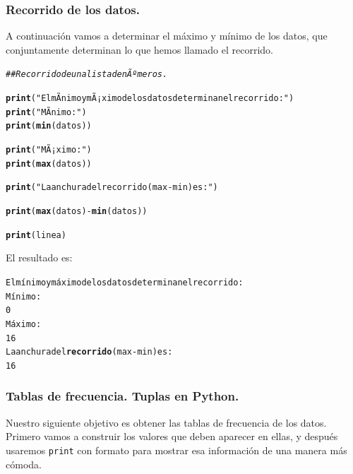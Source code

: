\documentclass[10pt,a4paper]{article}\usepackage[]{graphicx}\usepackage[]{color}
\makeatletter
\newcommand{\hlstr}[1]{\textcolor[rgb]{0.192,0.494,0.8}{#1}}%
\newcommand{\hlcom}[1]{\textcolor[rgb]{0.678,0.584,0.686}{\textit{#1}}}%
\newcommand{\hlopt}[1]{\textcolor[rgb]{0,0,0}{#1}}%
\newcommand{\hlstd}[1]{\textcolor[rgb]{0.345,0.345,0.345}{#1}}%
\newcommand{\hlkwd}[1]{\textcolor[rgb]{0.737,0.353,0.396}{\textbf{#1}}}%
\newenvironment{kframe}{%
 \def\at@end@of@kframe{}%
 \ifinner\ifhmode%
  \def\at@end@of@kframe{\end{minipage}}%
  \begin{minipage}{\columnwidth}%
 \fi\fi%
 \def\FrameCommand##1{\hskip\@totalleftmargin \hskip-\fboxsep
 \colorbox{shadecolor}{##1}\hskip-\fboxsep
     \hskip-\linewidth \hskip-\@totalleftmargin \hskip\columnwidth}%
 \MakeFramed {\advance\hsize-\width
   \@totalleftmargin\z@ \linewidth\hsize
   \@setminipage}}%
 {\par\unskip\endMakeFramed%
 \at@end@of@kframe}
\newenvironment{knitrout}{}{} %
\newcounter {cont01}
\makeatother
\begin{document}
\subsubsection*{Recorrido de los datos.}
\label{tut02:subsubsec:recorridoDatos}

A continuación vamos a determinar el máximo y mínimo de los datos, que conjuntamente determinan lo que hemos llamado el recorrido.

\begin{knitrout}
\color{fgcolor}\begin{kframe}
\begin{alltt}
\hlcom{## Recorrido de una lista de nÃºmeros.  }

\hlkwd{print}\hlstd{(}\hlstr{"El mÃ­nimo y mÃ¡ximo de los datos determinan el recorrido:"}\hlstd{)}
\hlkwd{print}\hlstd{(}\hlstr{"MÃ­nimo:"}\hlstd{)}
\hlkwd{print}\hlstd{(}\hlkwd{min}\hlstd{(datos))}

\hlkwd{print}\hlstd{(}\hlstr{"MÃ¡ximo:"}\hlstd{)}
\hlkwd{print}\hlstd{(}\hlkwd{max}\hlstd{(datos))}

\hlkwd{print}\hlstd{(}\hlstr{"La anchura del recorrido (max - min) es:"}\hlstd{)}

\hlkwd{print}\hlstd{(}\hlkwd{max}\hlstd{(datos)} \hlopt{-} \hlkwd{min}\hlstd{(datos))}

\hlkwd{print}\hlstd{(linea)}
\end{alltt}
\end{kframe}
\end{knitrout}

El resultado es:
\begin{knitrout}
\color{fgcolor}\begin{kframe}
\begin{alltt}
El mínimo y máximo de los datos determinan el recorrido:
Mínimo:
0
Máximo:
16
La anchura del \hlkwd{recorrido} (max - min) es:
16
\end{alltt}
\end{kframe}
\end{knitrout}

\subsubsection*{Tablas de frecuencia. Tuplas en Python.}
\label{tut02:subsubsec:tablasFrecuenciaTuplas}

Nuestro siguiente objetivo es obtener las tablas de frecuencia de los datos. Primero vamos a construir los valores que deben aparecer en ellas, y después usaremos {\tt print} con formato para mostrar esa información de una manera más cómoda.
\end{document}
